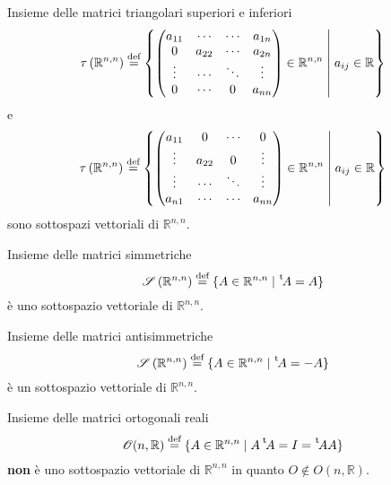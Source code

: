 \begin{Def}{Insieme delle matrici triangolari superiori e inferiori}
    \begin{equation*}
      \tau \left( \mathbb{R}^{n,n} \right)\bydef \left\{
        \begin{pmatrix}
          a_{11} & \cdots & \cdots & a_{1n}\\
          0 & a_{22} & \cdots & a_{2n}\\
          \vdots & \cdots & \ddots & \vdots\\
          0 & \cdots & 0 & a_{nn}
        \end{pmatrix}\in\mathbb{R}^{n,n}
        \Setsuchthat a_{ij}\in\mathbb{R}
      \right\}
    \end{equation*}
    e
    \begin{equation*}
      \tau \left( \mathbb{R}^{n,n} \right)\bydef \left\{
        \begin{pmatrix}
          a_{11} & 0 & \cdots & 0\\
          \vdots & a_{22} & 0 & \vdots\\
          \vdots & \cdots & \ddots & \vdots\\
          a_{n1} & \cdots & \cdots & a_{nn}
        \end{pmatrix}\in\mathbb{R}^{n,n}
        \Setsuchthat a_{ij}\in\mathbb{R}
      \right\}
    \end{equation*}
    sono sottospazi vettoriali di $\mathbb{R}^{n,n}$.
\end{Def}

\begin{Def}{Insieme delle matrici simmetriche}
  \begin{equation*}
    \mathscr{S}\left( \mathbb{R}^{n,n} \right)\bydef \left\{A\in\mathbb{R}^{n,n}\Setsuchthat
    \transp A = A\right\}
  \end{equation*}
  è uno sottospazio vettoriale di $\mathbb{R}^{n,n}$.
\end{Def}

\begin{Def}{Insieme delle matrici antisimmetriche}
  \begin{equation*}
    \mathscr{S}\left( \mathbb{R}^{n,n} \right)\bydef \left\{A\in\mathbb{R}^{n,n}\Setsuchthat
    \transp A = -A\right\}
  \end{equation*}
  è un sottospazio vettoriale di $\mathbb{R}^{n,n}$.
\end{Def}

\begin{Def}{Insieme delle matrici ortogonali reali}
  \begin{equation*}
    \mathscr{O}(n,\mathbb{R})\bydef \left\{ A\in\mathbb{R}^{n,n}\Setsuchthat A\transp A
    = I = \transp A A\right\}
  \end{equation*}
  \textbf{non} è uno sottospazio vettoriale di $\mathbb{R}^{n,n}$ in quanto $O\notin
  O(n,\mathbb{R})$.
\end{Def}

